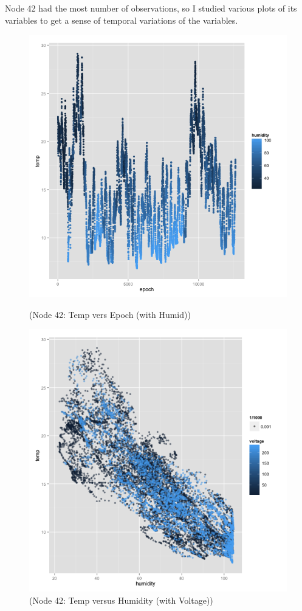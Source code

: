 \documentclass[english]{article}\usepackage[]{graphicx}\usepackage[]{color}
\begin{document}
Node 42 had the most number of observations, so I studied various plots of its variables to get a sense of temporal variations of the variables.   
\begin{figure}[H]
\centering
\begin{minipage}{.50\textwidth}
\centering
\includegraphics[width=\linewidth]{42epochtemphumid}
\caption{(Node 42: Temp vers Epoch (with Humid))}
\label{fig:test1}
\end{minipage}\hfill
\begin{minipage}{.50\textwidth}
\centering
\includegraphics[width=\linewidth]{42temphumid}
\caption{(Node 42: Temp versus Humidity (with Voltage))}
\label{fig:test2}
\end{minipage}
\end{figure}
\end{document}
